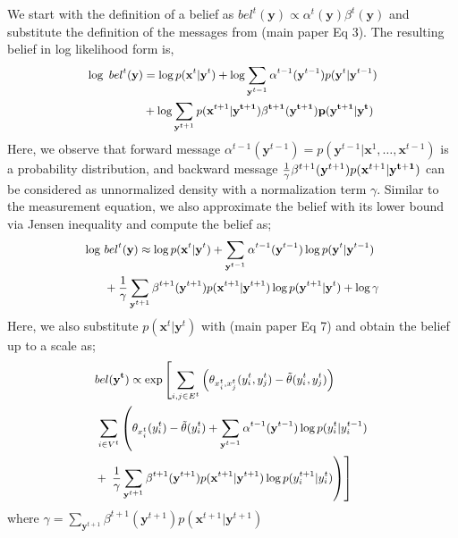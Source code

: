 We start with the definition of a belief as \mbox{$bel^t(\mathbf{y}) \propto  \alpha^t(\mathbf{y}) \beta^t(\mathbf{y})$} and substitute the definition of the messages from (main paper Eq 3). The resulting belief in log likelihood form is,
\begin{equation}\small
\begin{aligned}
\log~bel^t(\mathbf{y}) &= \log p(\mathbf{x}^t|\mathbf{y}^t) + \log \sum_{\mathbf{y}^{t-1}} \alpha^{t-1}(\mathbf{y}^{t-1}) p(\mathbf{y}^{t}|\mathbf{y}^{t-1}) \\
&+ \log \sum_{\mathbf{y}^{t+1}} p(\mathbf{x}^{t+1}|\bf{y}^{t+1}) \beta^{t+1}(\mathbf{y}^{t+1}) p(\mathbf{y}^{t+1}|\mathbf{y}^{t})
\end{aligned}
\end{equation}
Here, we observe that forward message \mbox{$\alpha^{t-1}(\mathbf{y}^{t-1})=p(\mathbf{y}^{t-1}|\mathbf{x}^{1},\ldots,\mathbf{x}^{t-1})$} is a probability distribution, and backward message $\frac{1}{\gamma} \beta^{t+1} (\mathbf{y}^{t+1})  p(\mathbf{x}^{t+1}|\bf{y}^{t+1})$ can be considered as unnormalized density with a normalization term $\gamma$. Similar to the measurement equation, we also approximate the belief with its lower bound via Jensen inequality and compute the belief as;
\begin{equation}\small
  \begin{aligned}
\log~&bel^t(\mathbf{y}) \approx \log p(\mathbf{x}^t|\mathbf{y}^t) + \sum_{\mathbf{y}^{t-1}} \alpha^{t-1}(\mathbf{y}^{t-1}) \log p(\mathbf{y}^{t}|\mathbf{y}^{t-1}) \\
&+ \frac{1}{\gamma}\sum_{\mathbf{y}^{t+1}}\beta^{t+1}(\mathbf{y}^{t+1}) p(\mathbf{x}^{t+1}|\mathbf{y}^{t+1}) \log p(\mathbf{y}^{t+1}|\mathbf{y}^{t})+\log{\gamma}
\end{aligned}
\end{equation}
Here, we also substitute $p(\mathbf{x}^t|\mathbf{y}^t)$ with (main paper Eq 7) and obtain the belief up to a scale as;
\begin{equation}\small
  \begin{aligned}
&bel(\mathbf{y^t}) \propto \exp\left[  \sum_{i,j \in E^t} \left( \theta_{x^t_i,x^t_j}(y^t_i,y^t_j) - \tilde{\theta}(y^t_i,y^t_j) \right) \right. \\
&\left. \sum_{i \in V^t} \left( \theta_{x^t_i}(y^t_i) - \tilde{\theta}(y^t_i) +  \sum_{\mathbf{y}^{t-1}} \alpha^{t-1}(\mathbf{y}^{t-1}) \log p(y^t_i|y^{t-1}_i) \right. \right. \\
&+\left.\left.\frac{1}{\gamma}\sum_{\mathbf{y}^{t+1}} \beta^{t+1}(\mathbf{y}^{t+1}) p(\mathbf{x}^{t+1}|\mathbf{y}^{t+1}) \log p(y^{t+1}_i|y^{t}_i) \right) \right]
\end{aligned}
\label{crfbelief}
\end{equation}
where $\gamma=\sum_{\mathbf{y}^{t+1}} \beta^{t+1}(\mathbf{y}^{t+1}) p(\mathbf{x}^{t+1}|\mathbf{y}^{t+1})$


